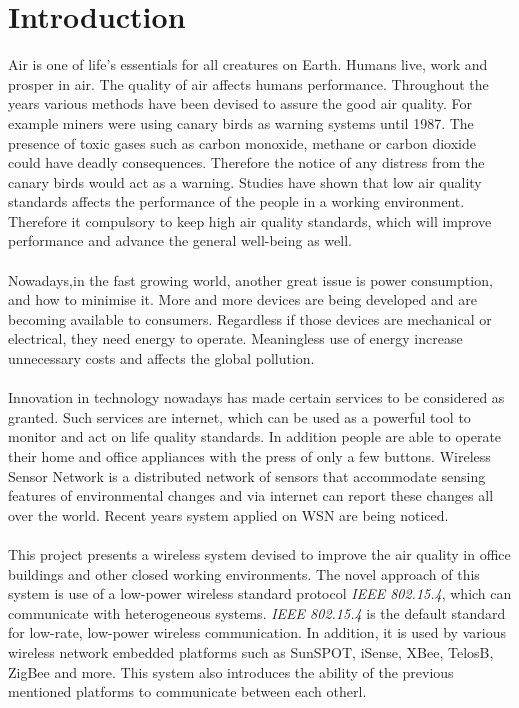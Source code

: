 \documentclass[12pt,a4paper]{report}
\begin{document}
\chapter{Introduction}
%
Air is one of life's essentials for all creatures on Earth. Humans live, work and prosper in air. The quality of air affects humans performance. Throughout the years various methods have been devised to assure the good air quality. For example miners were using canary birds as warning systems until 1987. The presence of toxic gases such as carbon monoxide, methane or carbon dioxide could have deadly consequences. Therefore the notice of any distress from the canary birds would act as a warning. Studies have shown that low air quality standards affects the performance of the people in a working environment.\cite{airquality} Therefore it compulsory to keep high air quality standards, which will improve performance and advance the general well-being as well.\\
\ \\
Nowadays,in the fast growing world, another great issue is power consumption, and how to minimise it. More and more devices are being developed and are becoming available to consumers. Regardless if those devices are mechanical or electrical, they need energy to operate. Meaningless use of energy increase unnecessary costs and affects the global pollution.\\
\ \\
Innovation in technology nowadays has made certain services to be considered as granted. Such services are internet, which can be used as a powerful tool to monitor and act on life quality standards. In addition people are able to operate their home and office appliances with the press of only a few buttons. Wireless Sensor Network is a distributed network of sensors that accommodate sensing features of environmental changes and via internet can report these changes all over the world. Recent years system applied on WSN are being noticed.\\
\ \\
This project presents a wireless system devised to improve the air quality in office buildings and other closed working environments. The novel approach of this system is use of a low-power wireless standard protocol \textit{IEEE 802.15.4}, which can communicate with heterogeneous systems. \textit{IEEE 802.15.4} is the default standard for low-rate, low-power wireless communication. In addition, it is used by various wireless network embedded platforms such as SunSPOT, iSense, XBee, TelosB, ZigBee and more. This system also introduces the ability of the previous mentioned platforms to communicate between each otherl.\\
\end{document}
